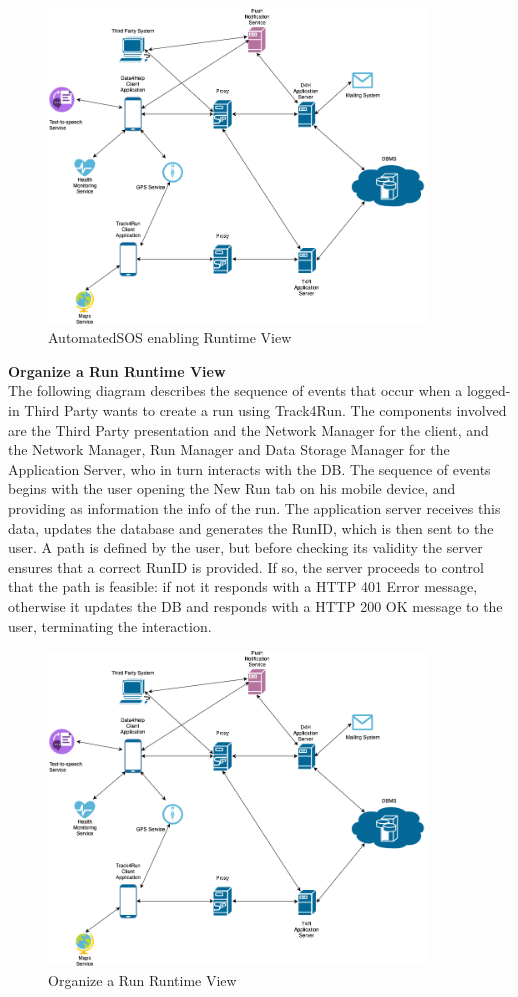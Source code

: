 \documentclass[titlepage]{article}
\begin{document}
\begin{figure}[H]
	\center
  	\includegraphics[width=10cm]{Overview.png} %
  	\caption{AutomatedSOS enabling Runtime View}
 	\label{fig:SOS}
\end{figure}


{\bf Organize a Run Runtime View }\\ 
The following diagram describes the sequence of events that occur when a logged-in Third Party wants to create a run using Track4Run.
The components involved are the Third Party presentation and the Network Manager for the client, and the Network Manager, Run Manager and Data Storage Manager for the Application Server, who in turn interacts with the DB.
The sequence of events begins with the user opening the New Run tab on his mobile device, and providing as information the info of the run. The application server receives this data, updates the database and generates the RunID, which is then sent to the user. A path is defined by the user, but before checking its validity the server ensures that a correct RunID is provided. If so, the server proceeds to control that the path is feasible: if not it responds with a HTTP 401 Error message, otherwise it updates the DB and responds with a HTTP 200 OK message to the user, terminating the interaction.

\begin{figure}[H]
	\center
  	\includegraphics[width=10cm]{Overview.png} %
  	\caption{Organize a Run Runtime View}
 	\label{fig:SOS}
\end{figure}
\end{document}
